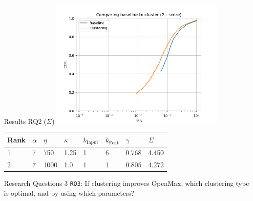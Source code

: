 \begin{frame}{Results RQ2 ($\Sigma$)}
	\centering
	\includegraphics[width=0.65\textwidth]{figures/compare_sigma.png}
	\footnotesize{
		\begin{tabularx}{\textwidth}{ |X|X|X|X|X|X|X|X| }
			\hline
			Rank & $\alpha$ & $\eta$ & $\kappa$ & $k_{\text{Input}}$ & $k_{\text{Feat}}$ & $\gamma$ & $\Sigma$ \\
			\hline
			1    & 7        & 750    & 1.25     & 1                  & 6                 & 0.768    & 4.450    \\
			2    & 7        & 1000   & 1.0      & 1                  & 1                 & 0.805    & 4.272    \\
			\hline
		\end{tabularx}
	}
\end{frame}

\begin{frame}{Research Questions 3}
	\texttt{RQ3}: If clustering improves OpenMax, which clustering type is optimal, and by using which parameters?
\end{frame}

